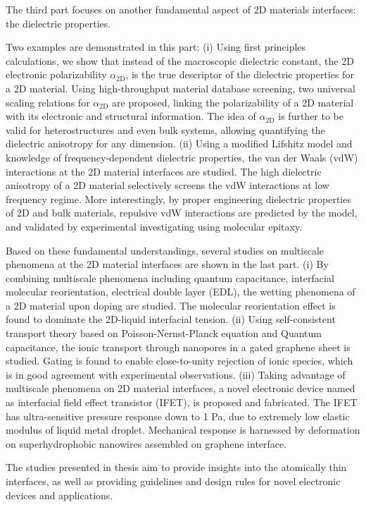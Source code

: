 The third part focuses on another fundamental aspect of 2D materials
interfaces: the dielectric properties.
%

%
Two examples are
demonstrated in this part:
%
(i) Using first principles calculations, we show that instead of the
macroscopic dielectric constant, the 2D electronic polarizability
$\alpha_{\mathrm{2D}}$, is the true descriptor of the dielectric
properties for a 2D material.  Using high-throughput material database
screening, two universal scaling relations for $\alpha_{\mathrm{2D}}$
are proposed, linking the polarizability of a 2D material with its
electronic and structural information.
%
The idea
of $\alpha_{\mathrm{2D}}$ is further to be valid for heterostructures
and even bulk systems, allowing quantifying the dielectric anisotropy
for any dimension.
%
(ii) Using a modified Lifshitz model and knowledge of
frequency-dependent dielectric properties, the van der Waals (vdW)
interactions at the 2D material interfaces are studied.
The high
dielectric anisotropy of a 2D material selectively screens the vdW
interactions at low frequency regime. More interestingly, by proper
engineering dielectric properties of 2D and bulk materials, repulsive
vdW interactions are predicted by the model, and validated by
experimental investigating using molecular epitaxy.

Based on these fundamental understandings, several
studies on multiscale phenomena at the 2D material interfaces are
shown in the last part.
%
(i) By combining multiscale phenomena including quantum capacitance,
interfacial molecular reorientation, electrical double layer (EDL),
the wetting phenomena of a 2D material upon doping are studied. The
molecular reorientation effect is found to dominate the 2D-liquid
interfacial tension.
%
(ii) Using self-consistent transport theory based on
Poisson-Nernst-Planck equation and Quantum capacitance, the ionic
transport through nanopores in a gated graphene sheet is
studied. Gating is found to enable close-to-unity rejection of ionic
species, which is in good agreement with experimental observations.
%
(iii) Taking advantage of multiscale phenomena on 2D material
interfaces, a novel electronic device named as interfacial field
effect transistor (IFET), is proposed and fabricated. The IFET has
ultra-sensitive pressure response down to 1 Pa, due to extremely low
elastic modulus of liquid metal droplet. Mechanical response is
harnessed by deformation on superhydrophobic nanowires assembled on
graphene interface.

The studies presented in thesis aim to provide insights into the
atomically thin interfaces, as well as providing guidelines and design
rules for novel electronic devices and applications.


